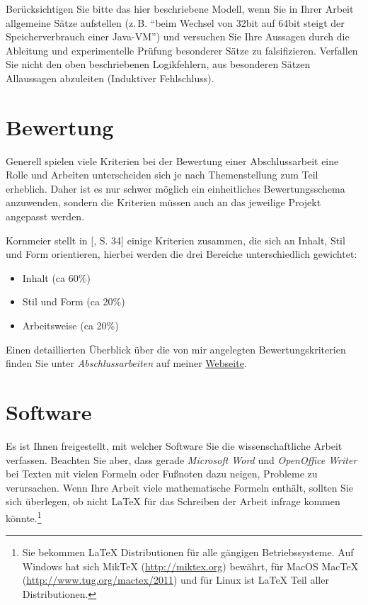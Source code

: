 \documentclass[a4paper,11pt,headings=normal]{scrartcl}
\begin{document}
Berücksichtigen Sie bitte das hier beschriebene Modell, wenn Sie in Ihrer Arbeit allgemeine Sätze aufstellen (z.\,B. "`beim Wechsel von 32bit auf 64bit steigt der Speicherverbrauch einer Java-VM"') und versuchen Sie Ihre Aussagen durch die Ableitung und experimentelle Prüfung besonderer Sätze zu falsifizieren. Verfallen Sie nicht den oben beschriebenen Logikfehlern, aus besonderen Sätzen Allaussagen abzuleiten (Induktiver Fehlschluss).


\section{Bewertung}

Generell spielen viele Kriterien bei der Bewertung einer Abschlussarbeit eine Rolle und Arbeiten unterscheiden sich je nach Themenstellung zum Teil erheblich. Daher ist es nur schwer möglich ein einheitliches Bewertungsschema anzuwenden, sondern die Kriterien müssen auch an das jeweilige Projekt angepasst werden.

Kornmeier stellt in [\autocite{Kornmeier2011}, S. 34] einige Kriterien zusammen, die sich an Inhalt, Stil und Form orientieren, hierbei werden die drei Bereiche unterschiedlich gewichtet:

\begin{itemize}
  \item Inhalt (ca 60\%)
  \item Stil und Form (ca 20\%)
  \item Arbeitsweise (ca 20\%)
\end{itemize}

Einen detaillierten Überblick über die von mir angelegten Bewertungskriterien finden Sie unter \textit{Abschlussarbeiten} auf meiner \href{http://www.smits-net.de/files/Bewertungskriterien_Abschlussarbeit.pdf}{Webseite}.


\section{Software}

Es ist Ihnen freigestellt, mit welcher Software Sie die wissenschaftliche Arbeit verfassen. Beachten Sie aber, dass gerade \textit{Microsoft Word} und \textit{OpenOffice Writer} bei Texten mit vielen Formeln oder Fußnoten dazu neigen, Probleme zu verursachen. Wenn Ihre Arbeit viele mathematische Formeln enthält, sollten Sie sich überlegen, ob nicht \LaTeX{} für das Schreiben der Arbeit infrage kommen könnte.\footnote{Sie bekommen \LaTeX{} Distributionen für alle gängigen Betriebssysteme. Auf Windows hat sich MikTeX (\url{http://miktex.org}) bewährt, für MacOS MacTeX (\url{http://www.tug.org/mactex/2011}) und für Linux ist \LaTeX{} Teil aller Distributionen.}
\end{document}
